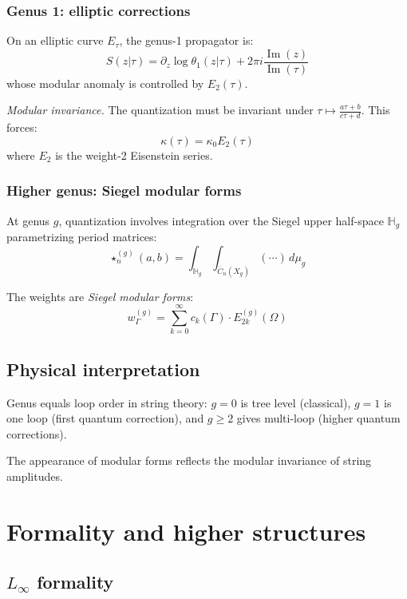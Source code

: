 \subsubsection{Genus 1: elliptic corrections}

On an elliptic curve $E_\tau$, the genus-1 propagator is:
\[S(z|\tau) = \partial_z \log \theta_1(z|\tau) + 2\pi i \frac{\operatorname{Im}(z)}{\operatorname{Im}(\tau)}\]
whose modular anomaly is controlled by $E_2(\tau)$.

\emph{Modular invariance.}
The quantization must be invariant under $\tau \mapsto \frac{a\tau+b}{c\tau+d}$. This forces:
\[\kappa(\tau) = \kappa_0 E_2(\tau)\]
where $E_2$ is the weight-2 Eisenstein series.

\subsubsection{Higher genus: Siegel modular forms}

At genus $g$, quantization involves integration over the Siegel upper half-space $\mathbb{H}_g$ parametrizing period matrices:
\[\star^{(g)}_n(a,b) = \int_{\mathbb{H}_g} \int_{\overline{C}_n(X_g)} (\cdots) \, d\mu_g\]

The weights are \emph{Siegel modular forms}:
\[w_\Gamma^{(g)} = \sum_{k=0}^\infty c_k(\Gamma) \cdot E_{2k}^{(g)}(\Omega)\]

\subsection{Physical interpretation}

Genus equals loop order in string theory: $g=0$ is tree level (classical), $g=1$ is one loop (first quantum correction), and $g \geq 2$ gives multi-loop (higher quantum corrections).

The appearance of modular forms reflects the modular invariance of string amplitudes.

\section{Formality and higher structures}

\subsection{\texorpdfstring{$L_\infty$ formality}{L- formality}}

